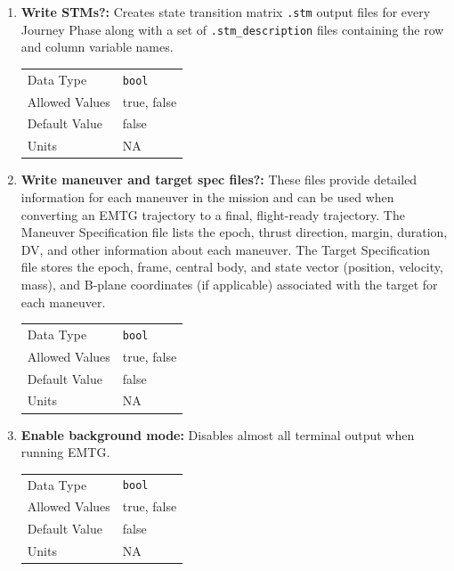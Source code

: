 \begin{enumerate}
    \item{\textbf{Write STMs?:}} Creates state transition matrix \verb|.stm| output files for every Journey Phase along with a set of \verb|.stm_description| files containing the row and column variable names.

        \begin{table}[H]
            \hspace{2cm}
            \begin{tabular}{ll}
            Data Type & \verb|bool| \\
            Allowed Values & true, false \\
            Default Value & false \\
            Units & NA
            \end{tabular}
        \end{table}

    \item{\textbf{Write maneuver and target spec files?:}} These files provide detailed information for each maneuver in the mission and can be used when converting an \ac{EMTG} trajectory to a final, flight-ready trajectory. The Maneuver Specification file lists the epoch, thrust direction, margin, duration, DV, and other information about each maneuver. The Target Specification file  stores the epoch, frame, central body, and state vector (position, velocity, mass), and B-plane coordinates (if applicable) associated with the target for each maneuver.
    
        \begin{table}[H]
            \hspace{2cm}
            \begin{tabular}{ll}
            Data Type & \verb|bool| \\
            Allowed Values & true, false \\
            Default Value & false \\
            Units & NA
            \end{tabular}
        \end{table}
    
    \item{\textbf{Enable background mode:}} Disables almost all terminal output when running \ac{EMTG}.
    
        \begin{table}[H]
            \hspace{2cm}
            \begin{tabular}{ll}
            Data Type & \verb|bool| \\
            Allowed Values & true, false \\
            Default Value & false \\
            Units & NA
            \end{tabular}
        \end{table}

\end{enumerate}


